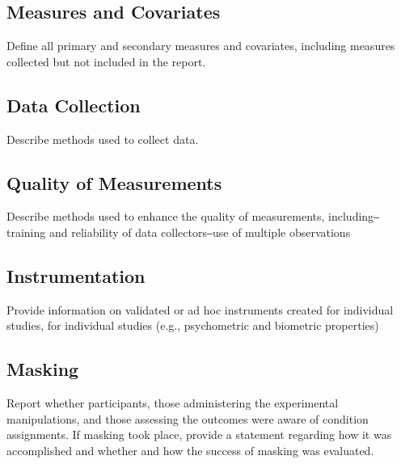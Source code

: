\documentclass[acmsmall]{acmart}
\begin{document}
\subsection{Measures and Covariates}
Define all primary and secondary measures and covariates, including measures collected but not included in the report.

\subsection{Data Collection}
Describe methods used to collect data.

\subsection{Quality of Measurements}
Describe methods used to enhance the quality of measurements, including‒training and reliability of data collectors‒use of multiple observations

\subsection{Instrumentation}
Provide information on validated or ad hoc instruments created for individual studies, for individual studies (e.g., psychometric and biometric properties)

\subsection{Masking}
Report whether participants, those administering the experimental manipulations, and those assessing the outcomes were aware of condition assignments. If masking took place, provide a statement regarding how it was accomplished and whether and how the success of masking was evaluated. 
\end{document}
